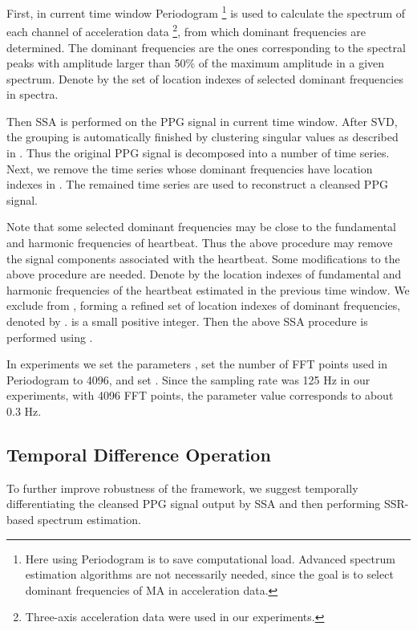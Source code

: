 \documentclass[10pt,twocolumn]{IEEEtran}
\begin{document}
First, in current time window Periodogram \footnote{Here using Periodogram is to save computational load. Advanced spectrum estimation algorithms are not necessarily needed, since the goal is to select dominant frequencies of MA in acceleration data.} is used to calculate the spectrum of each channel of acceleration data \footnote{Three-axis acceleration data were used in our experiments.}, from which dominant frequencies are determined. The dominant frequencies are the ones corresponding to the spectral peaks with amplitude larger than 50\% of the maximum amplitude in a given spectrum. Denote by  the set of location indexes of selected dominant frequencies in spectra.

Then SSA is performed on the PPG signal in current time window. After SVD, the grouping is automatically finished by clustering singular values as described in \cite[pp. 66]{golyandina2001SSA}. Thus the original PPG signal is decomposed into a number of time series. Next, we remove the time series whose  dominant frequencies have  location indexes in . The remained time series are used to reconstruct a cleansed PPG signal.



Note that some selected dominant frequencies  may be close to the fundamental and harmonic frequencies of heartbeat. Thus the above procedure may remove the signal components associated with the heartbeat. Some modifications to the above procedure are needed. Denote by  the location indexes of fundamental and harmonic frequencies of the heartbeat estimated in the previous time window. We exclude  from , forming a refined set of location indexes of dominant frequencies, denoted by  .  is a small positive integer. Then the above SSA procedure is performed using .


In experiments we set the parameters , set the number of FFT points used in Periodogram  to 4096, and set . Since the sampling rate was 125 Hz in our experiments, with 4096 FFT points, the parameter value  corresponds to about 0.3 Hz.






\subsection{Temporal Difference Operation}

To further improve robustness of the framework, we suggest temporally differentiating the cleansed PPG signal output by SSA and then performing SSR-based spectrum estimation.
\end{document}
